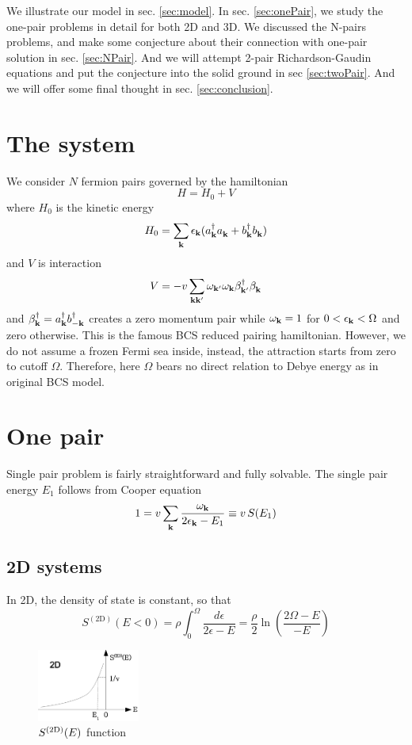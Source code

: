 \documentclass[aps,prb,showpacs,reprint]{revtex4-1}
\begin{document}
We illustrate our model in sec. \ref{sec:model}.  In sec. \ref{sec:onePair}, we study the one-pair problems in detail for both 2D and 3D.  We discussed the N-pairs problems, and make some conjecture about their connection with one-pair solution  in sec. \ref{sec:NPair}.  And we will attempt 2-pair Richardson-Gaudin equations and put the conjecture into the solid ground in sec \ref{sec:twoPair}.  And we will offer some final thought in sec. \ref{sec:conclusion}.
\section{The system\label{sec:model}}
We consider $N$ fermion pairs governed by the hamiltonian
\begin{equation}
H=H_{0}+V
\end{equation}
where $H_0$ is the kinetic energy 
\begin{equation}
H_0=\sum_{\mathbf{k}}\epsilon_{\mathbf{k}}(a^\dagger_{\mathbf{k}}{}a^{}_{\mathbf{k}}+b^\dagger_{\mathbf{k}}{}b^{}_{\mathbf{k}})
\label{eq:}
\end{equation}
and $V$ is interaction
\begin{equation}
V=-v\sum_{\mathbf{k}\mathbf{k}'}\omega_{\mathbf{k}'}\omega_{\mathbf{k}}\beta^\dagger_{\mathbf{k}'}{}\beta^{}_{\mathbf{k}}
\label{eq:VBcs}
\end{equation}
and $\beta^\dagger_{\mathbf{k}}=a^\dagger_{\mathbf{k}}b^\dagger_{-\mathbf{k}}$ creates a zero momentum pair while $\omega_{\mathbf{k}}=1$ for $0<\epsilon_{\mathbf{k}}<\Omega$ and zero otherwise.  This is the famous BCS reduced pairing hamiltonian. However, we do not assume a frozen Fermi sea inside, instead, the attraction starts from zero to cutoff $\Omega$.  Therefore, here $\Omega$ bears no direct relation to Debye energy as in original BCS model. 
\section{One pair\label{sec:onePair}}
Single pair problem is fairly straightforward and fully solvable.  The single pair energy $E_1$ follows from Cooper equation
\begin{equation}
1=v\sum_{\mathbf{k}}\frac{\omega_{\mathbf{k}}}{2\epsilon_{\mathbf{k}}-E_1}\equiv{}v\,S(E_1)
\label{eq:onePair}
\end{equation}
\subsection{2D systems}
In 2D, the density of state is constant, so that 
\begin{equation}
S^{(\text{2D})}(E<0)=\rho\int_0^{\Omega}\frac{d\epsilon}{2\epsilon-E}=\frac{\rho}{2}\ln\left(\frac{2\Omega-E}{-E}\right)
\label{eq:}
\end{equation}
\begin{figure}[htbp]
	\centering
		\includegraphics[width=0.30\textwidth]{2dOnePair.eps}
	\caption{$S^{{\text{(2D)}}}(E)$ function}
	\label{fig:2dOnePair}
\end{figure}
\end{document}
